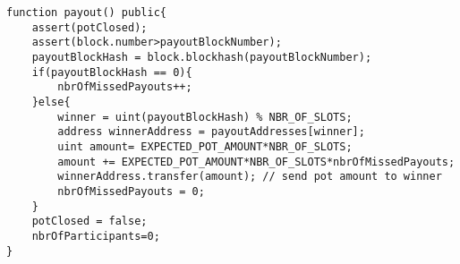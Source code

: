 \begin{lstlisting}[basicstyle=\small]
function payout() public{
    assert(potClosed);
    assert(block.number>payoutBlockNumber);
    payoutBlockHash = block.blockhash(payoutBlockNumber); 
    if(payoutBlockHash == 0){
        nbrOfMissedPayouts++;
    }else{
        winner = uint(payoutBlockHash) % NBR_OF_SLOTS;
        address winnerAddress = payoutAddresses[winner];
        uint amount= EXPECTED_POT_AMOUNT*NBR_OF_SLOTS;
        amount += EXPECTED_POT_AMOUNT*NBR_OF_SLOTS*nbrOfMissedPayouts;
        winnerAddress.transfer(amount); // send pot amount to winner
        nbrOfMissedPayouts = 0;
    }
    potClosed = false;
    nbrOfParticipants=0;
}
\end{lstlisting}

